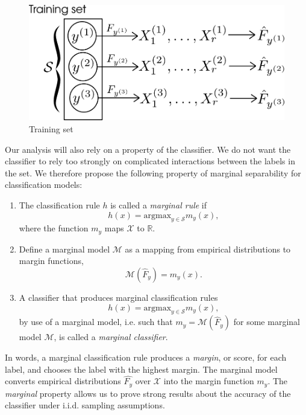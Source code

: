 \begin{figure}[h]
\centering
\includegraphics[scale = 0.4]{../extrapolation_figures/training_set.png}
\caption{Training set}\label{fig:training_set}
\end{figure}

Our analysis will also rely on a property of the classifier. We do not
want the classifier to rely too strongly on complicated interactions
between the labels in the set. We therefore propose the following
property of marginal separability for classification models:

\begin{definition}
\begin{enumerate}
\item The classification rule $h$ is called a \emph{marginal rule} if 
\[
h(x) = \text{argmax}_{y \in \mathcal{S}} m_y(x),
\]
where the function $m_y$ maps $\mathcal{X}$ to $\mathbb{R}$. 
\item Define a marginal model $\mathcal{M}$ as a mapping from empirical distributions
to margin functions,
\[
\mathcal{M}(\hat{F}_y) = m_y(x).
\]
\item A classifier that produces marginal classification rules
\[
h(x) = \text{argmax}_{y \in \mathcal{S}} m_y(x),
\]
by use of a marginal model, i.e. such that
$m_y=\mathcal{M}(\hat{F}_y)$ for some marginal model $\mathcal{M}$,
is called a \emph{marginal classifier}.
\end{enumerate}
\end{definition}
In words, a marginal classification rule produces a \emph{margin}, or
score, for each label, and chooses the label with the highest
margin. The marginal model converts empirical distributions
$\hat{F_y}$ over $\mathcal{X}$ into the margin function
$m_y$.  The \emph{marginal} property allows us to prove strong results
about the accuracy of the classifier under i.i.d. sampling assumptions.

